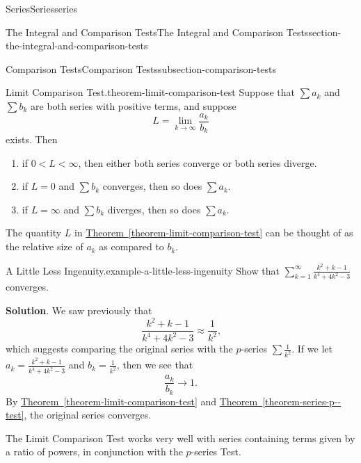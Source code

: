 \documentclass[oneside,10pt,]{book}
\numberwithin{equation}{section}
\newcommand{\lt}{<}
\begin{document}
\begin{chapterptx}{Series}{}{Series}{}{}{series}
\begin{sectionptx}{The Integral and Comparison Tests}{}{The Integral and Comparison Tests}{}{}{section-the-integral-and-comparison-tests}
\begin{subsectionptx}{Comparison Tests}{}{Comparison Tests}{}{}{subsection-comparison-tests}
\begin{theorem}{Limit Comparison Test.}{}{theorem-limit-comparison-test}%
\hypertarget{p-888}{}%
Suppose that \(\sum a_{k}\) and \(\sum b_{k}\) are both series with positive terms, and suppose%
\begin{equation*}
L = \lim_{k\to\infty}\frac{a_{k}}{b_{k}}
\end{equation*}
exists. Then\leavevmode%
\begin{enumerate}
\item\hypertarget{li-96}{}\hypertarget{p-889}{}%
if \(0 \lt L \lt \infty\), then either both series converge or both series diverge.%
\item\hypertarget{li-97}{}\hypertarget{p-890}{}%
if \(L = 0\) and \(\sum b_{k}\) converges, then so does \(\sum a_{k}\).%
\item\hypertarget{li-98}{}\hypertarget{p-891}{}%
if \(L = \infty\) and \(\sum b_{k}\) diverges, then so does \(\sum a_{k}\).%
\end{enumerate}
%
\end{theorem}
\hypertarget{p-892}{}%
The quantity \(L\) in \hyperref[theorem-limit-comparison-test]{Theorem~\ref{theorem-limit-comparison-test}} can be thought of as the relative size of \(a_{k}\) as compared to \(b_{k}\).%
\begin{example}{A Little Less Ingenuity.}{example-a-little-less-ingenuity}%
\hypertarget{p-893}{}%
Show that \(\sum_{k=1}^{\infty}\frac{k^{2} + k - 1}{k^{4} + 4k^{2} - 3}\) converges.%
\par\smallskip%
\noindent\textbf{Solution}.\hypertarget{solution-183}{}\quad%
\hypertarget{p-894}{}%
We saw previously that%
\begin{equation*}
\frac{k^{2} + k - 1}{k^{4} + 4k^{2} - 3} \approx \frac{1}{k^{2}}\text{,}
\end{equation*}
which suggests comparing the original series with the \(p\)-series \(\sum\frac{1}{k^{2}}\). If we let \(a_{k} = \frac{k^{2} + k - 1}{k^{4} + 4k^{2} - 3}\) and \(b_{k} = \frac{1}{k^{2}}\), then we see that%
\begin{equation*}
\frac{a_{k}}{b_{k}} \to 1\text{.}
\end{equation*}
By \hyperref[theorem-limit-comparison-test]{Theorem~\ref{theorem-limit-comparison-test}} and \hyperref[theorem-series-p--test]{Theorem~\ref{theorem-series-p--test}}, the original series converges.%
\end{example}
\hypertarget{p-895}{}%
The Limit Comparison Test works very well with series containing terms given by a ratio of powers, in conjunction with the \(p\)-series Test.%

\end{subsectionptx}
\end{sectionptx}
\end{chapterptx}
\end{document}
